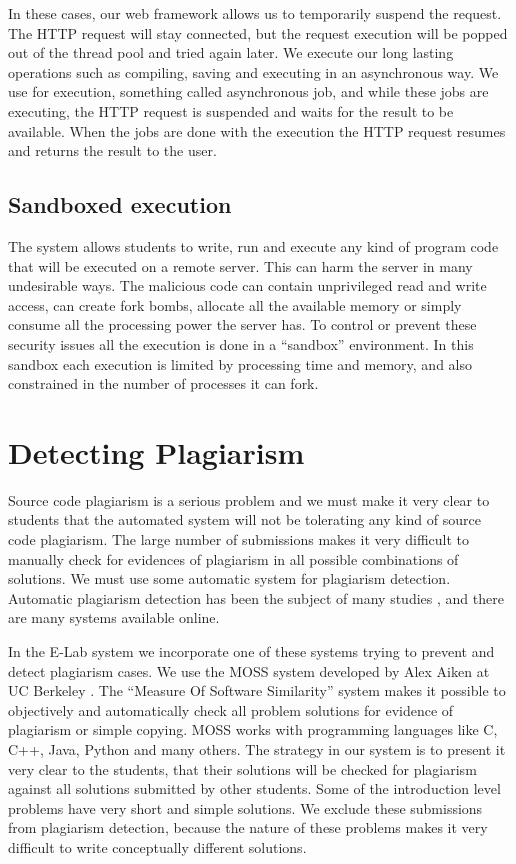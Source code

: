 \documentclass{llncs}
\begin{document}
In these cases, our web framework allows us to temporarily suspend the request.
The HTTP request will stay connected, but the request execution will be popped
out of the thread pool and tried again later. We execute our long lasting
operations such as compiling, saving and executing in an asynchronous way. We
use for execution, something called asynchronous job, and while these jobs are
executing, the HTTP request is suspended and waits for the result to be
available. When the jobs are done with the execution the HTTP request resumes
and returns the result to the user.

\subsection{Sandboxed execution}

The system allows students to write, run and execute any kind of program code
that will be executed on a remote server. This can harm the server in many
undesirable ways. The malicious code can contain unprivileged read and write
access, can create fork bombs, allocate all the available memory or simply
consume all the processing power the server has. To control or prevent these
security issues all the execution is done in a “sandbox” environment. In this
sandbox each execution is limited by processing time and memory, and also
constrained in the number of processes it can fork.

\section{Detecting Plagiarism}

Source code plagiarism is a serious problem and we must make it very clear to
students that the automated system will not be tolerating any kind of source
code plagiarism. The large number of submissions makes it very difficult to
manually check for evidences of plagiarism in all possible combinations of
solutions. We must use some automatic system for plagiarism detection. Automatic
plagiarism detection has been the subject of many studies
\cite{baker1995finding}, \cite{clough2000plagiarism} and there are many systems
available online.

In the E-Lab system we incorporate one of these systems trying to prevent and
detect plagiarism cases. We use the MOSS system developed by Alex Aiken at UC
Berkeley \cite{aiken2005moss}. The “Measure Of Software Similarity” system makes
it possible to objectively and automatically check all problem solutions for evidence of
plagiarism or simple copying. MOSS works with programming languages like C, C++,
Java, Python and many others. The strategy in our system is to present it very
clear to the students, that their solutions will be checked for plagiarism
against all solutions submitted by other students. Some of the introduction
level problems have very short and simple solutions. We exclude these
submissions from plagiarism detection, because the nature of these problems
makes it very difficult to write conceptually different solutions.
\end{document}
